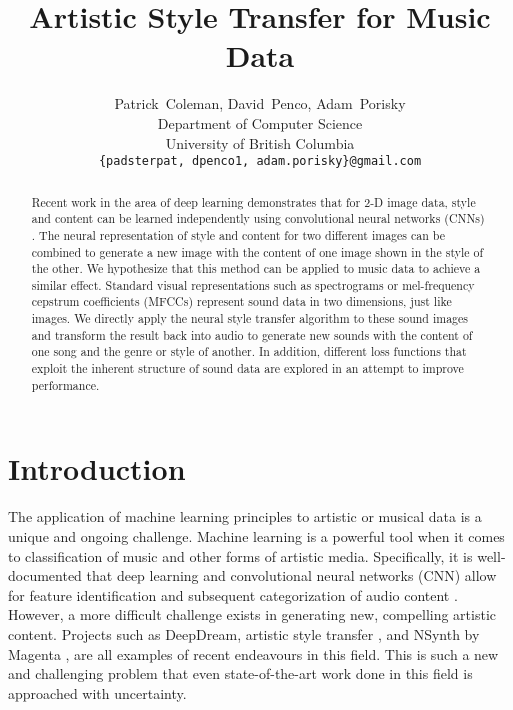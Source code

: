 \documentclass{article}
\title{Artistic Style Transfer for Music Data}
\author{
  Patrick~Coleman, David~Penco, Adam~Porisky \\
  Department of Computer Science\\
  University of British Columbia\\
  \texttt{\{padsterpat, dpenco1, adam.porisky\}@gmail.com} \\
}
\begin{document}


\maketitle

\begin{abstract}
  Recent work in the area of deep learning demonstrates that for 2-D image data, style and content can be learned independently using convolutional neural networks (CNNs) . The neural representation of style and content for two different images can be combined to generate a new image with the content of one image shown in the style of the other. We hypothesize that this method can be applied to music data to achieve a similar effect. Standard visual representations such as spectrograms or mel-frequency cepstrum coefficients (MFCCs) represent sound data in two dimensions, just like images. We directly apply the neural style transfer algorithm to these sound images and transform the result back into audio to generate new sounds with the content of one song and the genre or style of another. In addition, different loss functions that exploit the inherent structure of sound data are explored in an attempt to improve performance. 
\end{abstract}

\section{Introduction}

The application of machine learning principles to artistic or musical data is a unique and ongoing challenge. Machine learning is a powerful tool when it comes to classification of music and other forms of artistic media. Specifically, it is well-documented that deep learning and convolutional neural networks (CNN) allow for feature identification and subsequent categorization of audio content \citep{feng2014, Li2010}. However, a more difficult challenge exists in generating new, compelling artistic content. Projects such as DeepDream, artistic style transfer \citep{Gatys2015}, and NSynth by Magenta \citep{nsynth2017}, are all examples of recent endeavours in this field. This is such a new and challenging problem that even state-of-the-art work done in this field is approached with uncertainty.
\end{document}

